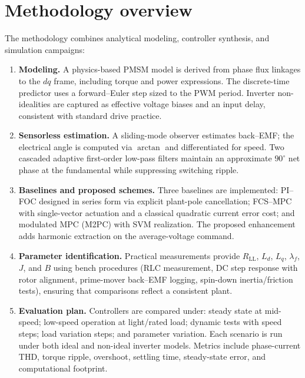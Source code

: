 \section{Methodology overview}
The methodology combines analytical modeling, controller synthesis, and simulation campaigns:
\begin{enumerate}
  \item \textbf{Modeling.} A physics-based PMSM model is derived from phase flux linkages to the $dq$ frame, including torque and power expressions. The discrete-time predictor uses a forward–Euler step sized to the PWM period. Inverter non-idealities are captured as effective voltage biases and an input delay, consistent with standard drive practice.
  \item \textbf{Sensorless estimation.} A sliding-mode observer estimates back–EMF; the electrical angle is computed via $\arctan$ and differentiated for speed. Two cascaded adaptive first-order low-pass filters maintain an approximate $90^\circ$ net phase at the fundamental while suppressing switching ripple.
  \item \textbf{Baselines and proposed schemes.} Three baselines are implemented: PI–FOC designed in series form via explicit plant-pole cancellation; FCS–MPC with single-vector actuation and a classical quadratic current error cost; and modulated MPC (M2PC) with SVM realization. The proposed enhancement adds harmonic extraction on the average-voltage command.
  \item \textbf{Parameter identification.} Practical measurements provide $R_{\mathrm{LL}}$, $L_d$, $L_q$, $\lambda_{f}$, $J$, and $B$ using bench procedures (RLC measurement, DC step response with rotor alignment, prime-mover back–EMF logging, spin-down inertia/friction tests), ensuring that comparisons reflect a consistent plant.
  \item \textbf{Evaluation plan.} Controllers are compared under: steady state at mid-speed; low-speed operation at light/rated load; dynamic tests with speed steps; load variation steps; and parameter variation. Each scenario is run under both ideal and non-ideal inverter models. Metrics include phase-current THD, torque ripple, overshoot, settling time, steady-state error, and computational footprint.
\end{enumerate}

